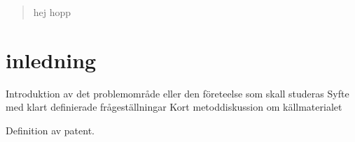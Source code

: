 \begin{abstract}
	hej hopp
\end{abstract}	
	
	
\section{inledning}	
Introduktion av det problemområde eller den företeelse som skall studeras
Syfte med klart definierade frågeställningar
Kort metoddiskussion om källmaterialet

Definition av patent.